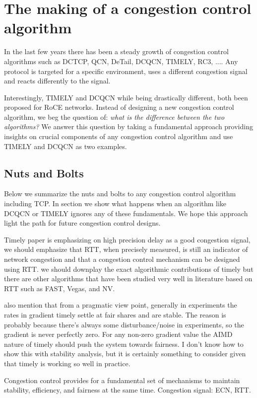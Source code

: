 \section{The making of a congestion control algorithm}

In the last few years there has been a steady growth of congestion control algorithms such as DCTCP, QCN, DeTail, DCQCN, TIMELY, RC3, .... Any protocol is targeted for a specific environment, uses a different congestion signal and reacts differently to the signal.

Interestingly, TIMELY and DCQCN while being drastically different, both been proposed for RoCE networks. Instead of designing a new congestion control algorithm, we beg the question of: \textit{what is the difference between the two algorithms?} We answer this question by taking a fundamental approach providing insights on crucial components of any congestion control algorithm and use TIMELY and DCQCN as two examples. 

\subsection{Nuts and Bolts}
Below we summarize the nuts and bolts to any congestion control algorithm including TCP. In section  we show what happens when an algorithm like DCQCN or TIMELY ignores any of these fundamentals. We hope this approach light the path for future congestion control designs.

Timely paper is emphasizing on high precision delay as a good congestion signal,
we should emphasize that RTT, when precisely measured, is still an indicator of
network congestion and that a congestion control mechanism can be designed using
RTT. we should downplay the exact algorithmic contributions of timely but there
are other algorithms that have been studied very well in literature based on RTT
such as FAST, Vegas, and NV.

also mention that from a pragmatic view point, generally in experiments the
rates in gradient timely settle at fair shares and are stable. The reason is
probably because there's always some disturbance/noise in experiments, so the
gradient is never perfectly zero. For any non-zero gradient value the AIMD
nature of timely should push the system towards fairness. I don't know how to
show this with stability analysis, but it is certainly something to consider
given that timely is working so well in practice.


Congestion control provides for a fundamental set of mechanisms to maintain
stability, efficiency, and fairness at the same time. Congestion signal: ECN,
RTT.

